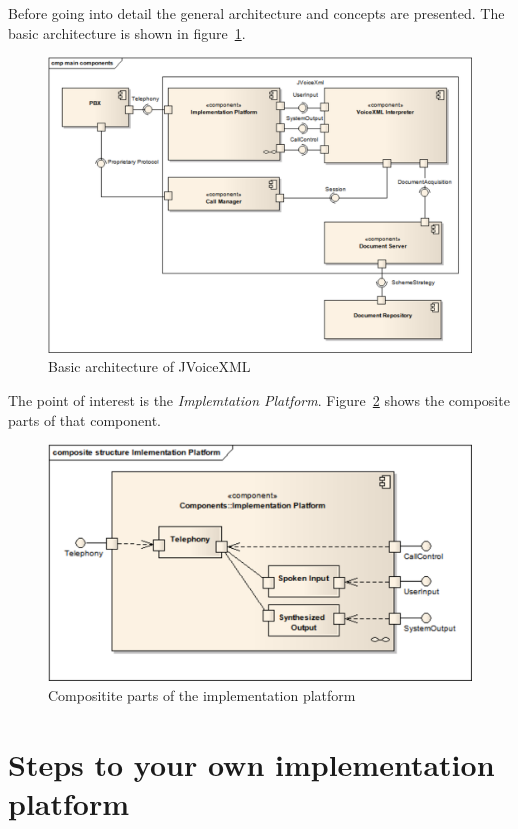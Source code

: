 \documentclass[11pt,a4paper]{article}
\begin{document}
Before going into detail the general architecture and concepts are presented.
The basic architecture is shown in figure~\ref{fig:main-components}.
\begin{figure}
\includegraphics[width=\linewidth]{cd-main-components}
\caption{Basic architecture of JVoiceXML}
\label{fig:main-components}
\end{figure}
The point of interest is the \emph{Implemtation Platform}.
Figure~\ref{fig:implementationplatform} shows the composite parts of that
component.
\begin{figure}
\includegraphics[width=\linewidth]{csd-implementation-platform}
\caption{Compositite parts of the implementation platform}
\label{fig:implementationplatform}
\end{figure}

\section{Steps to your own implementation platform}
\end{document}
